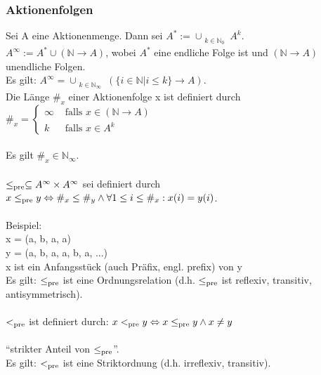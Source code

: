 \subsubsection*{Aktionenfolgen}
Sei A eine Aktionenmenge. Dann sei $A^* := \cup_{\substack{k \in \mathbb{N}_0}} A^k$.\\
$A^\infty := A^* \cup (\mathbb{N} \rightarrow A)$, wobei $A^*$ eine endliche Folge ist und $(\mathbb{N} \rightarrow A)$ unendliche Folgen.\\
Es gilt: $A^\infty = \cup_{\substack{k \in \mathbb{N}_\infty}} (\{i \in \mathbb{N} | i \leq k\} \rightarrow A)$.\\
Die Länge $\#_x$ einer Aktionenfolge x ist definiert durch $\#_x = \begin{cases}
\infty&\text{ falls } x \in (\mathbb{N} \rightarrow A)\\
k&\text{ falls }x \in A^k
\end{cases}$\\
\\
Es gilt $\#_x \in \mathbb{N}_\infty$.\\
\\
$\leq_{\operatorname{pre}} \subseteq A^\infty \times A^\infty$ sei definiert durch $x \leq_{\operatorname{pre}} y \Leftrightarrow \#_x \leq \#_y \land \forall 1 \leq i \leq \#_x: x(i) = y(i)$.\\
\\
Beispiel: \\
x = (a, b, a, a)\\
y = (a, b, a, a, b, a, ...)\\
x ist ein Anfangsstück (auch Präfix, engl. prefix) von y\\
Es gilt: $\leq_{\operatorname{pre}}$ ist eine Ordnungsrelation (d.h. $\leq_{\operatorname{pre}}$ ist reflexiv, transitiv, antisymmetrisch).\\
\\
$<_{\operatorname{pre}}$ ist definiert durch: $x <_{\operatorname{pre}} y \Leftrightarrow x \leq_{\operatorname{pre}} y \land x \neq y$\\
\\
"`strikter Anteil von $\leq_{\operatorname{pre}}$"'.\\
Es gilt: $<_{\operatorname{pre}}$ ist eine Striktordnung (d.h. irreflexiv, transitiv).
